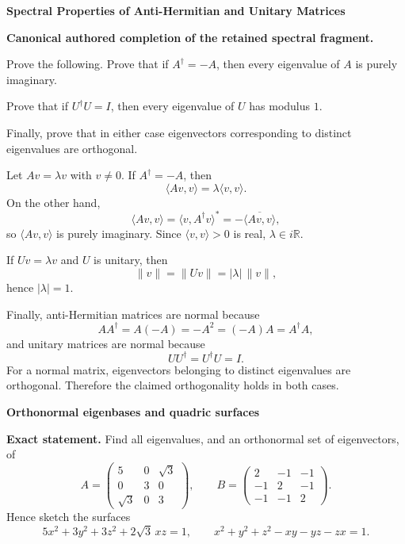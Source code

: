 \begin{problem}[CP-I-0118]
\label{prob:cp-i-0118}
\textbf{Spectral Properties of Anti-Hermitian and Unitary Matrices}

\textbf{Canonical authored completion of the retained spectral fragment.}

\hspace*{1.5em}Prove the following.
Prove that if \(A^\dagger=-A\), then every eigenvalue of \(A\) is purely imaginary.

Prove that if \(U^\dagger U=I\), then every eigenvalue of \(U\) has modulus \(1\).

Finally, prove that in either case eigenvectors corresponding to distinct eigenvalues are orthogonal.
\end{problem}

\begin{solution}
Let \(Av=\lambda v\) with \(v\neq0\). If \(A^\dagger=-A\), then
\[
\langle Av,v\rangle
=
\lambda\langle v,v\rangle.
\]
On the other hand,
\[
\langle Av,v\rangle
=
\langle v,A^\dagger v\rangle^{\!*}
=
-\overline{\langle Av,v\rangle},
\]
so \(\langle Av,v\rangle\) is purely imaginary. Since \(\langle v,v\rangle>0\) is real,
\(\lambda\in i\mathbb R\).

If \(Uv=\lambda v\) and \(U\) is unitary, then
\[
\|v\|=\|Uv\|=|\lambda|\,\|v\|,
\]
hence \(|\lambda|=1\).

Finally, anti-Hermitian matrices are normal because
\[
AA^\dagger=A(-A)=-A^2=(-A)A=A^\dagger A,
\]
and unitary matrices are normal because
\[
UU^\dagger=U^\dagger U=I.
\]
For a normal matrix, eigenvectors belonging to distinct eigenvalues are orthogonal. Therefore
the claimed orthogonality holds in both cases.
\end{solution}

\begin{problem}[CP-I-0120]
\label{prob:cp-i-0120}
\textbf{Orthonormal eigenbases and quadric surfaces}

\textbf{Exact statement.}
\hspace*{1.5em}Find all eigenvalues, and an orthonormal set of eigenvectors, of
\[
A=\begin{pmatrix}5&0&\sqrt3\\[2pt]0&3&0\\[2pt]\sqrt3&0&3\end{pmatrix},
\qquad
B=\begin{pmatrix}2&-1&-1\\[2pt]-1&2&-1\\[2pt]-1&-1&2\end{pmatrix}.
\]
Hence sketch the surfaces
\[
5x^2+3y^2+3z^2+2\sqrt3\,xz=1,
\qquad
x^2+y^2+z^2-xy-yz-zx=1.
\]

\end{problem}

